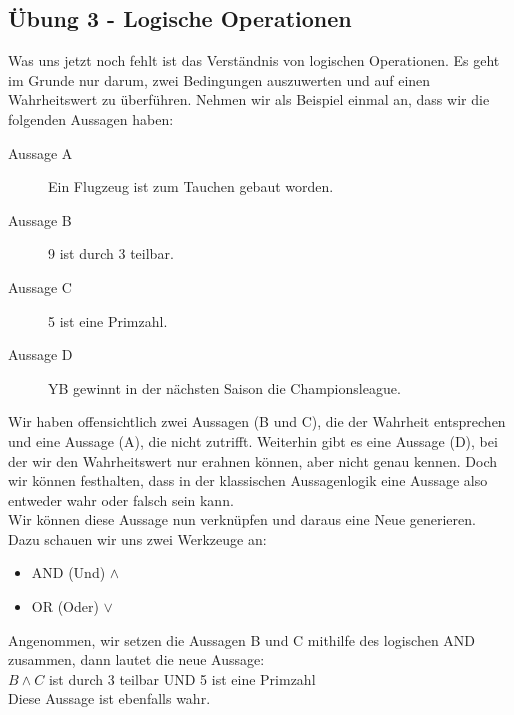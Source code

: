 \newpage
\subsection{Übung 3 - Logische Operationen}
Was uns jetzt noch fehlt ist das Verständnis von logischen Operationen. Es geht im Grunde nur darum,
zwei Bedingungen auszuwerten und auf einen Wahrheitswert zu überführen. Nehmen wir als Beispiel einmal an,
dass wir die folgenden Aussagen haben:
\begin{description}
    \item[Aussage A] Ein Flugzeug ist zum Tauchen gebaut worden.
    \item[Aussage B] 9 ist durch 3 teilbar.
    \item[Aussage C] 5 ist eine Primzahl.
    \item[Aussage D] YB gewinnt in der nächsten Saison die Championsleague.
\end{description}
Wir haben offensichtlich zwei Aussagen (B und C), die der Wahrheit entsprechen und eine
Aussage (A), die nicht zutrifft. Weiterhin gibt es eine Aussage (D), bei der wir den Wahrheitswert nur
erahnen können, aber nicht genau kennen. Doch wir können festhalten, dass in der klassischen Aussagenlogik
eine Aussage also entweder wahr oder falsch sein kann.\cite{wikipedia:aussagenlogik}\\

Wir können diese Aussage nun verknüpfen und daraus eine Neue generieren. Dazu schauen wir uns zwei
Werkzeuge an:
\begin{itemize}
    \item AND (Und) $\land$
    \item OR (Oder) $\lor$
\end{itemize}
Angenommen, wir setzen die Aussagen B und C mithilfe des logischen AND zusammen, dann
lautet die neue Aussage:\\$B \land C$ ist durch 3 teilbar UND 5 ist eine Primzahl\flqq\\
Diese Aussage ist ebenfalls wahr.

